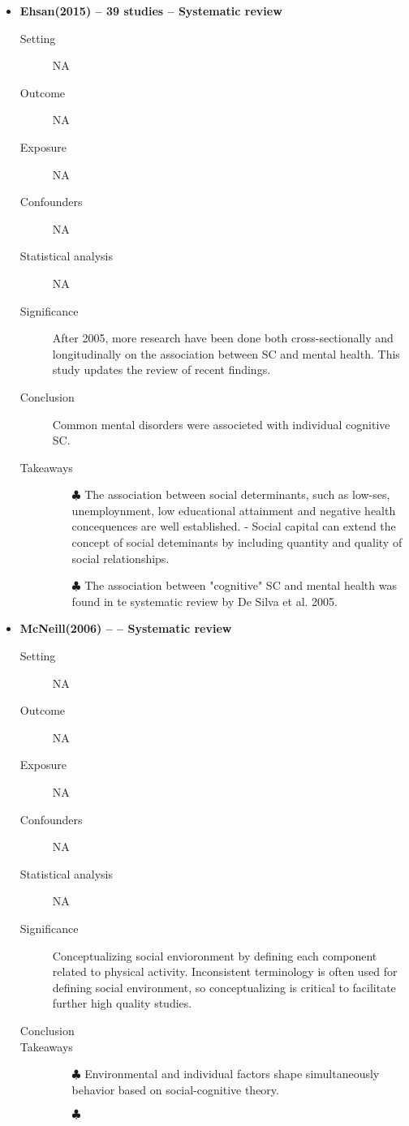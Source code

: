 \documentclass{article}
\begin{document}
\begin{itemize}
\item{\bf Ehsan(2015) -- 39 studies  -- Systematic review} 
		\begin{description}
			\item[Setting] NA 
			\item[Outcome] NA 
			\item[Exposure] NA
			\item[Confounders] NA
			\item[Statistical analysis] NA
			\item[Significance] After 2005, more research have been done both cross-sectionally and longitudinally on the association between SC and mental health. This study updates the review of recent findings. 
			\item[Conclusion] Common mental disorders were associeted with individual cognitive SC. 
			\item[Takeaways] \mbox{}\par
				\begin{itemize}
					\item[$\clubsuit$] The association between social determinants, such as low-ses, unemploynment, low educational attainment and negative health concequences are well established. - Social capital can extend the concept of social deteminants by including quantity and quality of social relationships.
					\item[$\clubsuit$] The association between "cognitive" SC and mental health was found in te systematic review by De Silva et al. 2005. 
				\end{itemize} 
		\end{description}

\item{\bf McNeill(2006) --   -- Systematic review} 
		\begin{description}
			\item[Setting] NA 
			\item[Outcome] NA 
			\item[Exposure] NA
			\item[Confounders] NA
			\item[Statistical analysis] NA
			\item[Significance] Conceptualizing social envioronment by defining each component related to physical activity. Inconsistent terminology is often used for defining social environment, so conceptualizing is critical to facilitate further high quality studies.
			\item[Conclusion] 
			\item[Takeaways] \mbox{}\par
				\begin{itemize}
					\item[$\clubsuit$] Environmental and individual factors shape simultaneously behavior based on social-cognitive theory.
					\item[$\clubsuit$]
				\end{itemize} 
		\end{description}

\end{itemize} %
\end{document}
